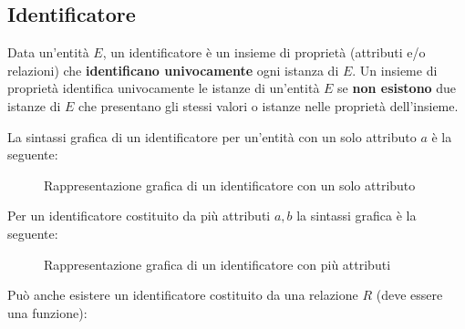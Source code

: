 \documentclass[a4paper]{article}
\begin{document}
\subsection{Identificatore}
Data un'entità \( E \), un identificatore è un insieme di proprietà (attributi e/o relazioni)
che \textbf{identificano univocamente} ogni istanza di \( E \). Un insieme di proprietà
identifica univocamente le istanze di un'entità \( E \) se \textbf{non esistono} due
istanze di \( E \) che presentano gli stessi valori o istanze nelle proprietà dell'insieme.

\vspace{1em}
\noindent
La sintassi grafica di un identificatore per un'entità con un solo attributo \( a \) è
la seguente:
\begin{figure}[H]
  \centering
  \caption{Rappresentazione grafica di un identificatore con un solo attributo}
\end{figure}
Per un identificatore costituito da più attributi \( a, b \) la sintassi grafica è la seguente:
\begin{figure}[H]
  \centering
  \caption{Rappresentazione grafica di un identificatore con più attributi}
\end{figure}
Può anche esistere un identificatore costituito da una relazione \( R \) (deve essere
una funzione):
\end{document}
